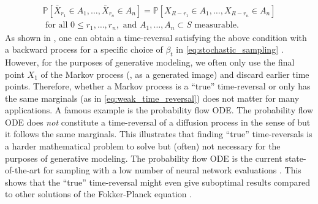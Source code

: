 \documentclass{fairmeta}
\numberwithin{equation}{section}
\begin{document}
\begin{align}
\mathbb{P}[\bar{X}_{r_1}\in A_1,\dots,\bar{X}_{r_n}\in A_n]=\mathbb{P}[X_{R-r_1}\in A_1,\dots,X_{R-r_n}\in A_n]\\
    \text{ for all }0\leq r_1,\dots, r_n, \text{ and } A_1,\dots,A_n\subset S\text{ measurable}.
\end{align}
As shown in \citet{anderson1982reverse}, one can obtain a time-reversal satisfying the above condition with a backward process for a specific choice of $\beta_t$ in \cref{eq:stochastic_sampling} . However, for the purposes of generative modeling, we often only use the final point $X_1$ of the Markov process (\eg, as a generated image) and discard earlier time points. Therefore, whether a Markov process is a ``true'' time-reversal or only has the same marginals (as in \cref{eq:weak_time_reversal}) does not matter for many applications. A famous example is the probability flow ODE. The probability flow ODE does \emph{not} constitute a time-reversal of a diffusion process in the sense of \citep{anderson1982reverse} but it follows the same marginals. This illustrates that finding ``true'' time-reversals is a harder mathematical problem to solve but (often) not necessary for the purposes of generative modeling. The probability flow ODE is the current state-of-the-art for sampling with a low number of neural network evaluations \citep{karras2022elucidating}. This shows that the ``true'' time-reversal might even give suboptimal results compared to other solutions of the Fokker-Planck equation \citep{ma2024sit}.

\pagebreak
\end{document}

